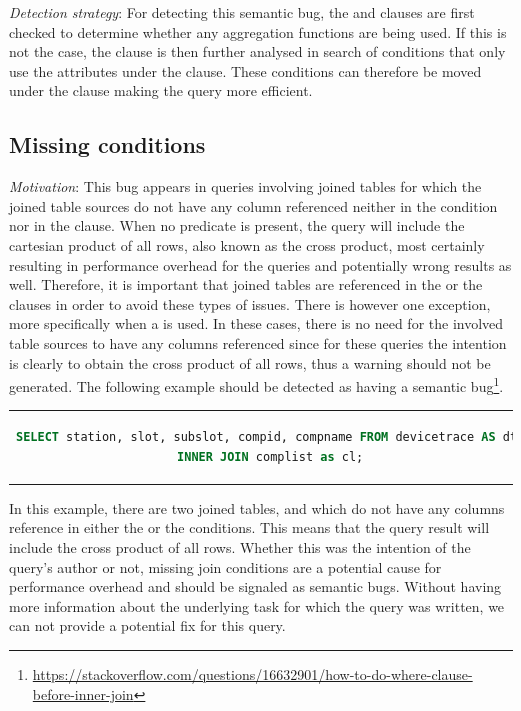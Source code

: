 \noindent \emph{Detection strategy}: For detecting this semantic bug, the  and  clauses are first checked to determine whether any aggregation functions are being used. If this is not the case, the  clause is then further analysed in search of conditions that only use the attributes under the  clause. These conditions can therefore be moved under the  clause making the query more efficient.

\subsection{Missing  conditions}
\emph{Motivation}: This bug appears in queries involving joined tables for which the joined table sources do not have any column referenced neither in the  condition nor in the  clause. When no  predicate is present, the query will include the cartesian product of all rows, also known as the cross product, most certainly resulting in performance overhead for the queries and potentially wrong results as well. Therefore, it is important that joined tables are referenced in the  or the  clauses in order to avoid these types of issues. There is however one exception, more specifically when a  is used. In these cases, there is no need for the involved table sources to have any columns referenced since for these queries the intention is clearly to obtain the cross product of all rows, thus a warning should not be generated. The following example should be detected as having a semantic bug\footnote{\url{https://stackoverflow.com/questions/16632901/how-to-do-where-clause-before-inner-join}}.

\begin{center}
\begin{tabular}{c}
\begin{lstlisting}[language=SQL]
SELECT station, slot, subslot, compid, compname FROM devicetrace AS dt 
INNER JOIN complist as cl;
\end{lstlisting}
\end{tabular}
\end{center}

In this example, there are two joined tables,  and  which do not have any columns reference in either the  or the  conditions. This means that the query result will include the cross product of all rows. Whether this was the intention of the query's author or not, missing join conditions are a potential cause for performance overhead and should be signaled as semantic bugs. Without having more information about the underlying task for which the query was written, we can not provide a potential fix for this query.\\

